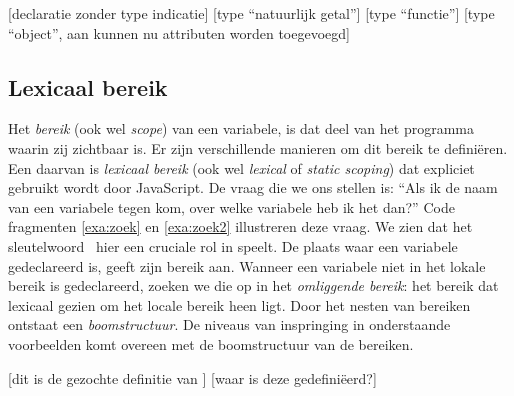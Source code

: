 \begin{NoBreak}
\codeFragmentCaption
\begin{codelines}
  [declaratie zonder type indicatie]
  [type ``natuurlijk getal'']
  [type ``functie'']
  [type ``object'', aan  kunnen nu attributen worden toegevoegd]
\end{codelines}
\end{NoBreak}

\subsection{Lexicaal bereik}

Het \emph{bereik} (ook wel \emph{scope}) van een variabele, is dat deel van het programma waarin zij zichtbaar is. Er zijn verschillende manieren om dit bereik te definiëren. Een daarvan is \emph{lexicaal bereik} (ook wel \emph{lexical} of \emph{static scoping}) dat expliciet gebruikt wordt door JavaScript.
De vraag die we ons stellen is: ``Als ik de naam van een variabele tegen kom, over welke variabele heb ik het dan?'' Code fragmenten \ref{exa:zoek} en \ref{exa:zoek2} illustreren deze vraag. We zien dat het sleutelwoord \LOCAL\ hier een cruciale rol in speelt. De plaats waar een variabele gedeclareerd is, geeft zijn bereik aan. Wanneer een variabele niet in het lokale bereik is gedeclareerd, zoeken we die op in het \emph{omliggende bereik}: het bereik dat lexicaal gezien om het locale bereik heen ligt.
Door het nesten van bereiken ontstaat een \emph{boomstructuur}. De niveaus van inspringing in onderstaande voorbeelden komt overeen met de boomstructuur van de bereiken.%

\begin{NoBreak}
\codeFragmentCaption
\begin{codelines}
  [dit is de gezochte definitie van ]
  \codeLine{}
  [waar is deze  gedefiniëerd?]
\end{codelines}
\end{NoBreak}

